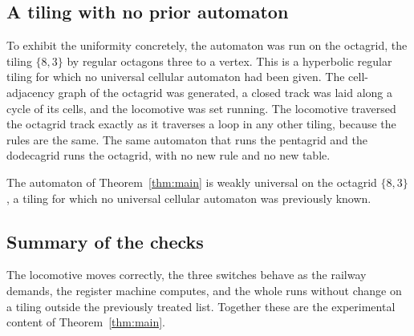 \subsection{A tiling with no prior automaton}

To exhibit the uniformity concretely, the automaton was run on the octagrid, the tiling $\{8,3\}$ by regular
octagons three to a vertex. This is a hyperbolic regular tiling for which no universal cellular automaton had
been given. The cell-adjacency graph of the octagrid was generated, a closed track was laid along a cycle of
its cells, and the locomotive was set running. The locomotive traversed the octagrid track exactly as it
traverses a loop in any other tiling, because the rules are the same. The same automaton that runs the
pentagrid and the dodecagrid runs the octagrid, with no new rule and no new table.

\begin{corollary}[Octagrid]
\label{cor:octagrid}
The automaton of Theorem~\ref{thm:main} is weakly universal on the octagrid $\{8,3\}$, a tiling for which no
universal cellular automaton was previously known.
\end{corollary}

\subsection{Summary of the checks}

The locomotive moves correctly, the three switches behave as the railway demands, the register machine
computes, and the whole runs without change on a tiling outside the previously treated list. Together these are
the experimental content of Theorem~\ref{thm:main}.
